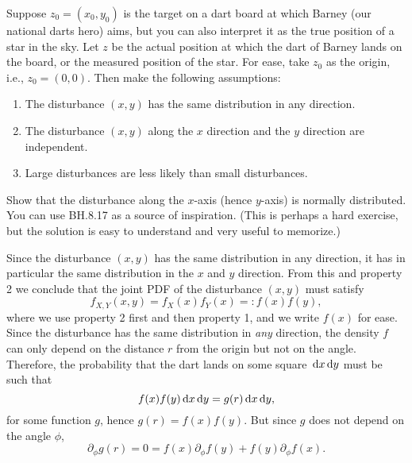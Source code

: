 \begin{exercise}\label{ex:1}
Suppose $z_0=(x_0,y_{0})$ is the target on a dart board at which Barney (our national darts hero) aims, but you can also interpret it as the true position of a star in the sky.
Let $z$ be the actual position at which the dart of Barney lands on the board, or the measured position of the star.
For ease, take $z_0$ as the origin, i.e., $z_0=(0,0)$.
Then make the following assumptions:
\begin{enumerate}
\item The disturbance $(x,y)$ has the same distribution in any direction.
\item The disturbance $(x,y)$ along the $x$ direction and the $y$ direction are independent.
\item Large disturbances are less likely than small disturbances.
\end{enumerate}
Show that the disturbance along the $x$-axis (hence $y$-axis) is normally distributed. You can use BH.8.17 as a source of inspiration. (This is perhaps a hard exercise, but  the solution is easy to understand and very useful to memorize.)

\begin{solution}
Since the disturbance $(x,y)$ has the same distribution in any direction, it has in particular the same distribution in the $x$ and $y$ direction.
From this and property 2 we conclude that the joint PDF of the disturbance $(x,y)$ must satisfy
\begin{equation}
  \label{eq:1}
  f_{X,Y}(x,y) = f_X(x)f_Y(x) =: f(x)f(y),
\end{equation}
where we use property 2 first and then property 1, and we write $f(x)$ for ease.
Since the disturbance has the same distribution in \textit{any} direction, the density $f$ can only depend on the distance $r$ from the origin but not on the angle. Therefore, the probability that the dart lands on some square $\,\textrm{d}x\,\textrm{d}y$ must be such that
\begin{equation}
  \label{eq:4}
  f(x)f(y) \,\textrm{d}x \,\textrm{d}y = g(r) \,\textrm{d}x \,\textrm{d}y,
\end{equation}
for some function $g$, hence $g(r) = f(x)f(y)$. But since $g$ does not depend on the angle $\phi$,
\begin{equation}
\label{eq:5}
\partial_{\phi} g(r) = 0 = f(x) \partial_{\phi}f(y) + f(y) \partial_{\phi}f(x).
\end{equation}


\end{solution}
\end{exercise}
